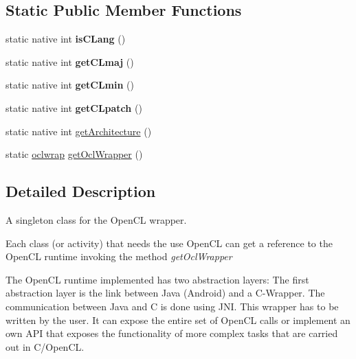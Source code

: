 \subsection*{Static Public Member Functions}
\begin{DoxyCompactItemize}
\item 
\mbox{\label{classcom_1_1example_1_1dmocl_1_1oclwrap_a3af03274f6d65e914c0f61ecc4541392}} 
static native int {\bfseries is\+C\+Lang} ()
\item 
\mbox{\label{classcom_1_1example_1_1dmocl_1_1oclwrap_a8d3b11bda003fad87ae98abd2dc20217}} 
static native int {\bfseries get\+C\+Lmaj} ()
\item 
\mbox{\label{classcom_1_1example_1_1dmocl_1_1oclwrap_ab21e9c2f0e53aba97cbe3a9937c9e7bf}} 
static native int {\bfseries get\+C\+Lmin} ()
\item 
\mbox{\label{classcom_1_1example_1_1dmocl_1_1oclwrap_ab693cebf65c86567189ea1f71bff0250}} 
static native int {\bfseries get\+C\+Lpatch} ()
\item 
static native int \mbox{\hyperlink{classcom_1_1example_1_1dmocl_1_1oclwrap_afd9731ebb0d18315fe3762fc329fcec4}{get\+Architecture}} ()
\item 
static \mbox{\hyperlink{classcom_1_1example_1_1dmocl_1_1oclwrap}{oclwrap}} \mbox{\hyperlink{classcom_1_1example_1_1dmocl_1_1oclwrap_a8c8c9a75d3d834cb71725d92ddeb4af7}{get\+Ocl\+Wrapper}} ()
\end{DoxyCompactItemize}


\subsection{Detailed Description}
A singleton class for the Open\+CL wrapper.

Each class (or activity) that needs the use Open\+CL can get a reference to the Open\+CL runtime invoking the method {\itshape get\+Ocl\+Wrapper}

The Open\+CL runtime implemented has two abstraction layers\+: The first abstraction layer is the link between Java (Android) and a C-\/\+Wrapper. The communication between Java and C is done using J\+NI. This wrapper has to be written by the user. It can expose the entire set of Open\+CL calls or implement an own A\+PI that exposes the functionality of more complex tasks that are carried out in C/\+Open\+CL.

